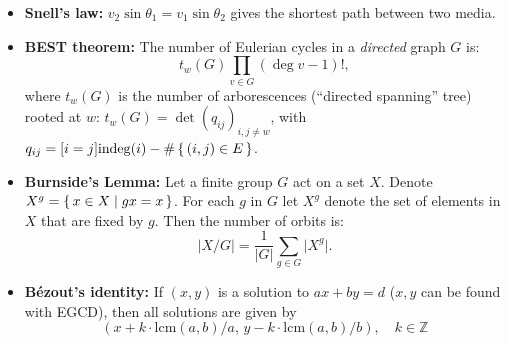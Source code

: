 \documentclass[8pt,a4paper,landscape,oneside]{amsart}
\newenvironment{myitemize}
{\begin{itemize}[leftmargin=.3cm]
	\setlength{\itemsep}{0pt}
	\setlength{\parskip}{0pt}
	\setlength{\parsep}{0pt}     }
{ \end{itemize}                  }
\begin{document}
\begin{multicols*}{3}
\begin{myitemize}
		expressed as a linear combination of numbers $a_1,\ldots,a_n$
		with non-negative coefficients. $g(a_1,a_2) = a_1a_2-a_1-a_2$,
		$N(a_1,a_2)=(a_1-1)(a_2-1)/2$. $g(d\cdot a_1,d\cdot a_2,a_3) =
		d\cdot g(a_1,a_2,a_3) + a_3(d-1)$. An integer $x>\left(\max_i
		a_i\right)^2$ can be expressed in such a way iff.\ $x\ |\
		\mathrm{gcd}(a_1,\ldots,a_n)$.
	\item \textbf{Snell's law:} $v_2 \sin\theta_1 = v_1 \sin\theta_2$ gives the shortest path between two media.
	\item \textbf{BEST theorem:}
		The number of Eulerian cycles in a \emph{directed} graph $G$ is:
		\begin{equation*}
			t_w(G) \prod_{v \in G} (\deg v - 1)!,
		\end{equation*}
		where $t_w(G)$ is the number of arborescences (``directed spanning'' tree) rooted at $w$: $t_w(G) = \det\left( q_{ij} \right)_{i,j \neq w}$, with $q_{ij} = [i=j] \mathrm{indeg}(i) - \# \set{(i,j) \in E}$.

	\item \textbf{Burnside's Lemma:}
		Let a finite group $G$ act on a set $X$.
		Denote $X^g = \set{ x \in X | gx = x}$.
		For each $g$ in $G$ let $X^g$ denote the set of elements in $X$ that are fixed by $g$.
		Then the number of orbits is:
		\begin{equation*}
			\lvert X/G \rvert = \frac{1}{\lvert G \rvert} \sum_{g\in G} \lvert X^g \rvert.
		\end{equation*}

\item \textbf{Bézout's identity:}
If $(x,y)$ is a solution to $ax+by=d$ ($x, y$ can be found with EGCD),
then all solutions are given by
\[
	\left( x + k \cdot \mathrm{lcm}(a,b) / a, \, y - k \cdot \mathrm{lcm}(a,b) / b \right), \quad k \in \mathbb{Z}
\]
\end{myitemize}


\end{multicols*}
\end{document}
